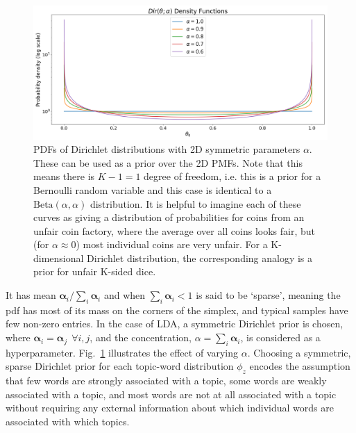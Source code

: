 \begin{figure}
	\centering
	\includegraphics[width=0.91\columnwidth]{figures/beta.png}
	\caption{
		PDFs of Dirichlet distributions with 2D symmetric parameters $\alpha$. These can be used as a prior over the 2D PMFs. Note that this means there is $K-1 = 1$ degree of freedom, i.e. this is a prior for a Bernoulli random variable and this case is identical to a $\mathrm{Beta}(\alpha, \alpha)$ distribution. It is helpful to imagine each of these curves as giving a distribution of probabilities for coins from an unfair coin factory, where the average over all coins looks fair, but (for $\alpha \approx 0$) most individual coins are very unfair. For a K-dimensional Dirichlet distribution, the corresponding analogy is a prior for unfair K-sided dice.
	}
	\label{fig:beta-pdf}

\end{figure}

It has mean $\boldsymbol{\alpha}_i / \sum_i \boldsymbol{\alpha}_i$ and when $\sum_i \boldsymbol{\alpha}_i < 1$ is said to be `sparse', meaning the pdf has most of its mass on the corners of the simplex, and typical samples have few non-zero entries. In the case of LDA, a symmetric Dirichlet prior is chosen, where $\boldsymbol{\alpha}_i = \boldsymbol{\alpha}_j ~~\forall i, j$, and the concentration, $\alpha = \sum_i \boldsymbol{\alpha}_i$, is considered as a hyperparameter. Fig.~\ref{fig:beta-pdf} illustrates the effect of varying $\alpha$. Choosing a symmetric, sparse Dirichlet prior for each topic-word distribution $\phi_z$ encodes the assumption that few words are strongly associated with a topic, some words are weakly associated with a topic, and most words are not at all associated with a topic without requiring any external information about which individual words are associated with which topics.

